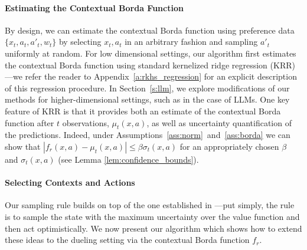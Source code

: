 \documentclass{article} \usepackage{iclr2023_conference,times}
\newcommand{\winner}{w}
\begin{document}
\paragraph{Estimating the Contextual Borda Function}
By design, we can estimate the contextual Borda function using preference data $\{x_t, a_t, a'_t, \winner_t\}$ by selecting $x_t, a_t$ in an arbitrary fashion and sampling $a'_t$ uniformly at random.
For low dimensional settings, our algorithm first estimates the contextual Borda function using standard kernelized ridge regression (KRR) \citep{rasmussen2006gaussian}---we refer the reader to Appendix~\ref{a:rkhs_regression} for an explicit description of this regression procedure.
In Section~\ref{s:llm}, we explore modifications of our methods for higher-dimensional settings, such as in the case of LLMs.
One key feature of KRR is that it  provides both an estimate of the contextual Borda function after $t$ observations, $\mu_t(x, a)$, as well as uncertainty quantification of the predictions.
Indeed, under Assumptions~\ref{ass:norm}~and~\ref{ass:borda} we can show that $|f_r(x, a) - \mu_t(x, a)| \leq \beta \sigma_t(x, a)$ for an appropriately chosen $\beta$ and $\sigma_t(x, a)$ (see Lemma \ref{lem:confidence_bounds}).

\paragraph{Selecting Contexts and Actions}
Our sampling rule builds on top of the one established in \citet{li2023nearoptimal}---put simply, the rule is to sample the state with the maximum uncertainty over the value function and then act optimistically.
We now present our algorithm which shows how to extend these ideas to the dueling setting via the contextual Borda function $f_r$.
\end{document}
